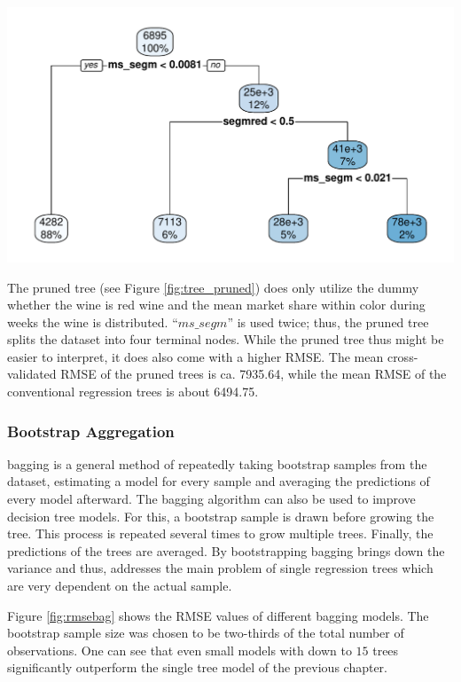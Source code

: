 \documentclass[11pt,]{article}
\let\origfigure\figure
\let\endorigfigure\endfigure
\renewenvironment{figure}[1][2] {
    \expandafter\origfigure\expandafter[H]
} {
    \endorigfigure
}
\begin{document}
\begin{figure}
\centering
\includegraphics{../00_data/output_paper/09_tree_pruned.pdf}
\caption{\label{fig:tree_pruned}Example of a Pruned Tree.}
\end{figure}

The pruned tree (see Figure \ref{fig:tree_pruned}) does only utilize the
dummy whether the wine is red wine and the mean market share within
color during weeks the wine is distributed. \enquote{\(ms\_segm\)} is
used twice; thus, the pruned tree splits the dataset into four terminal
nodes. While the pruned tree thus might be easier to interpret, it does
also come with a higher \ac{RMSE}. The mean cross-validated \ac{RMSE} of
the pruned trees is ca. 7935.64, while the mean \ac{RMSE} of the
conventional regression trees is about 6494.75.

\hypertarget{bootstrap-aggregation}{%
\subsubsection{Bootstrap Aggregation}\label{bootstrap-aggregation}}

\ac{bagging} is a general method of repeatedly taking bootstrap samples
from the dataset, estimating a model for every sample and averaging the
predictions of every model afterward. The \ac{bagging} algorithm can
also be used to improve decision tree models. For this, a bootstrap
sample is drawn before growing the tree. This process is repeated
several times to grow multiple trees. Finally, the predictions of the
trees are averaged. By bootstrapping \ac{bagging} brings down the
variance and thus, addresses the main problem of single regression trees
which are very dependent on the actual sample.

Figure \ref{fig:rmsebag} shows the \ac{RMSE} values of different
\ac{bagging} models. The bootstrap sample size was chosen to be
two-thirds of the total number of observations. One can see that even
small models with down to \(15\) trees significantly outperform the
single tree model of the previous chapter.
\end{document}
